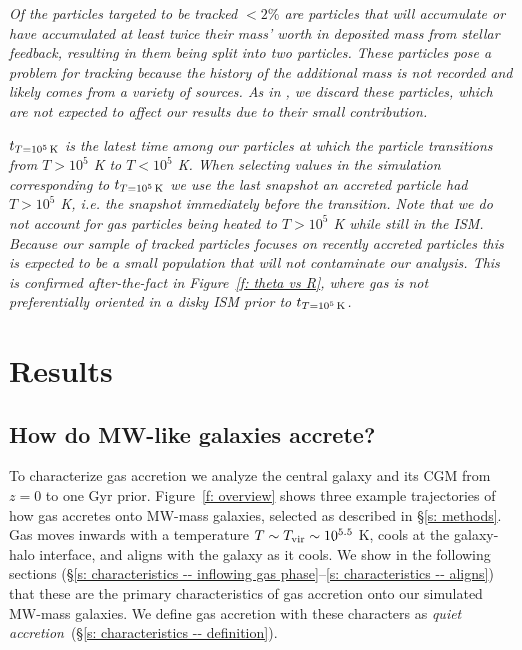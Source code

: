 \documentclass[fleqn,usenatbib]{mnras}
\newcommand{\tcon}{t_{T=10^5\,{\rm K}}}
\begin{document}
\textit{
Of the particles targeted to be tracked $<2\%$ are particles that will accumulate or have accumulated at least twice their mass' worth in deposited mass from stellar feedback, resulting in them being split into two particles.
These particles pose a problem for tracking because the history of the additional mass is not recorded and likely comes from a variety of sources.
As in \cite{Hafen2019}, we discard these particles, which are not expected to affect our results due to their small contribution.
}

\textit{
$\tcon$ is the latest time among our particles at which the particle transitions from $T > 10^5$ K to $T< 10^5$ K.
When selecting values in the simulation corresponding to $\tcon$ we use the last snapshot an accreted particle had $T > 10^5$ K, i.e. the snapshot immediately before the transition.
Note that we do not account for gas particles being heated to $T > 10^5$ K while still in the ISM.
Because our sample of tracked particles focuses on recently accreted particles this is expected to be a small population that will not contaminate our analysis.
This is confirmed after-the-fact in Figure~\ref{f: theta vs R}, where gas is not preferentially oriented in a disky ISM prior to $\tcon$.
}

\section{Results}
\label{s: results}


\subsection{How do MW-like galaxies accrete?}
\label{s: characteristics}

To characterize gas accretion we analyze the central galaxy and its CGM from $z=0$ to one Gyr prior.
Figure~\ref{f: overview} shows three example trajectories of how gas accretes onto MW-mass galaxies, selected as described in \S\ref{s: methods}.
Gas moves inwards with a temperature $T \sim T_{\rm vir} \sim 10^{5.5}$ K, cools at the galaxy-halo interface, and aligns with the galaxy as it cools.
We show in the following sections (\S\ref{s: characteristics -- inflowing gas phase}--\ref{s: characteristics -- aligns}) that these are the primary characteristics of gas accretion onto our simulated MW-mass galaxies.
We define gas accretion with these characters as \textit{quiet accretion}~(\S\ref{s: characteristics -- definition}).
\end{document}
